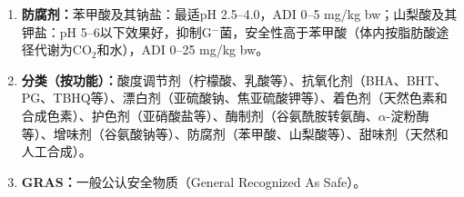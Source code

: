 {\begin{enumerate}[leftmargin=*, itemsep=6pt]
    \item \textbf{防腐剂：}苯甲酸及其钠盐：最适pH 2.5--4.0，ADI 0--5 mg/kg bw；山梨酸及其钾盐：pH 5--6以下效果好，抑制G$^-$菌，安全性高于苯甲酸（体内按脂肪酸途径代谢为CO$_2$和水），ADI 0--25 mg/kg bw。

    \item \textbf{分类（按功能）：}酸度调节剂（柠檬酸、乳酸等）、抗氧化剂（BHA、BHT、PG、TBHQ等）、漂白剂（亚硫酸钠、焦亚硫酸钾等）、着色剂（天然色素和合成色素）、护色剂（亚硝酸盐等）、酶制剂（谷氨酰胺转氨酶、$\alpha$-淀粉酶等）、增味剂（谷氨酸钠等）、防腐剂（苯甲酸、山梨酸等）、甜味剂（天然和人工合成）。

    \item \textbf{GRAS：}一般公认安全物质（General Recognized As Safe）。
\end{enumerate}

\newpage
}
